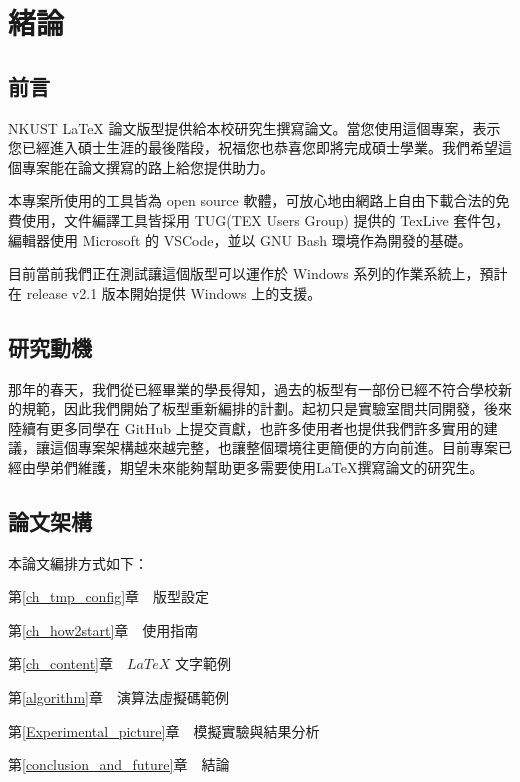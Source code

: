 
\chapter{緒論}\label{introduction}


\section{前言}\label{preface}

NKUST LaTeX 論文版型提供給本校研究生撰寫論文。當您使用這個專案，表示您已經進入碩士生涯的最後階段，祝福您也恭喜您即將完成碩士學業。我們希望這個專案能在論文撰寫的路上給您提供助力。

本專案所使用的工具皆為 open source 軟體，可放心地由網路上自由下載合法的免費使用，文件編譯工具皆採用 TUG(TEX Users Group) 提供的 TexLive 套件包，編輯器使用 Microsoft 的 VSCode，並以 GNU Bash 環境作為開發的基礎。

目前當前我們正在測試讓這個版型可以運作於 Windows 系列的作業系統上，預計在 release v2.1 版本開始提供 Windows 上的支援。

\newpage

\section{研究動機}\label{motive}

那年的春天，我們從已經畢業的學長得知，過去的板型有一部份已經不符合學校新的規範，因此我們開始了板型重新編排的計劃。起初只是實驗室間共同開發，後來陸續有更多同學在 GitHub 上提交貢獻，也許多使用者也提供我們許多實用的建議，讓這個專案架構越來越完整，也讓整個環境往更簡便的方向前進。目前專案已經由學弟們維護，期望未來能夠幫助更多需要使用LaTeX撰寫論文的研究生。


\newpage

\section{論文架構}\label{thesis_arch}
\n 本論文編排方式如下：

第\ref{ch_tmp_config}章　版型設定

第\ref{ch_how2start}章　使用指南

第\ref{ch_content}章　$LaTeX$ 文字範例

第\ref{algorithm}章　演算法虛擬碼範例

第\ref{Experimental_picture}章　模擬實驗與結果分析

第\ref{conclusion_and_future}章　結論
